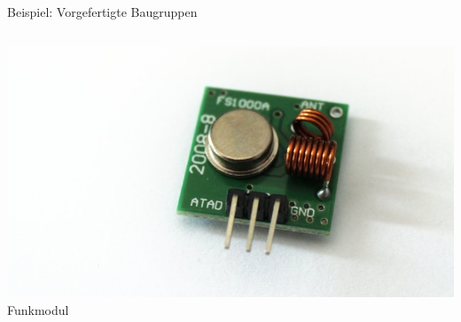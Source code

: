 {\begin{frame}{Beispiel: Vorgefertigte Baugruppen}
\begin{columns}
        \includegraphics[width=.8\textwidth]{2-hardwaredesign/img/komponenten_baugruppen_funk} \\
        Funkmodul
    \end{columns}
\end{frame}
}

